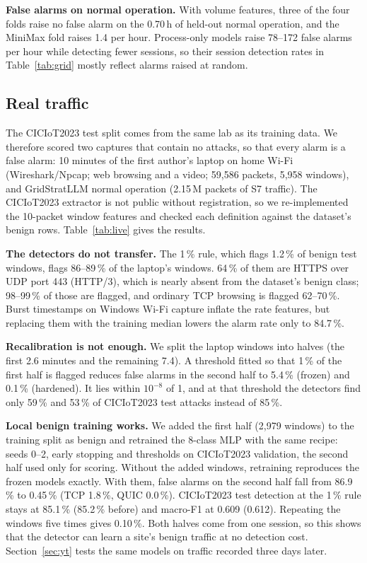 \documentclass[conference]{IEEEtran}
\begin{document}
\textbf{False alarms on normal operation.} With volume features, three of the four folds raise no false alarm on the 0.70\,h of held-out normal operation, and the MiniMax fold raises 1.4 per hour. Process-only models raise 78--172 false alarms per hour while detecting fewer sessions, so their session detection rates in Table~\ref{tab:grid} mostly reflect alarms raised at random.

\subsection{Real traffic}\label{sec:live}
The CICIoT2023 test split comes from the same lab as its training data. We therefore scored two captures that contain no attacks, so that every alarm is a false alarm: 10 minutes of the first author's laptop on home Wi-Fi (Wireshark/Npcap; web browsing and a video; 59,586 packets, 5,958 windows), and GridStratLLM normal operation (2.15\,M packets of S7 traffic). The CICIoT2023 extractor is not public without registration, so we re-implemented the 10-packet window features and checked each definition against the dataset's benign rows. Table~\ref{tab:live} gives the results.

\textbf{The detectors do not transfer.} The 1\,\% rule, which flags 1.2\,\% of benign test windows, flags 86--89\,\% of the laptop's windows. 64\,\% of them are HTTPS over UDP port 443 (HTTP/3), which is nearly absent from the dataset's benign class; 98--99\,\% of those are flagged, and ordinary TCP browsing is flagged 62--70\,\%. Burst timestamps on Windows Wi-Fi capture inflate the rate features, but replacing them with the training median lowers the alarm rate only to 84.7\,\%.

\textbf{Recalibration is not enough.} We split the laptop windows into halves (the first 2.6 minutes and the remaining 7.4). A threshold fitted so that 1\,\% of the first half is flagged reduces false alarms in the second half to 5.4\,\% (frozen) and 0.1\,\% (hardened). It lies within $10^{-8}$ of 1, and at that threshold the detectors find only 59\,\% and 53\,\% of CICIoT2023 test attacks instead of 85\,\%.

\textbf{Local benign training works.} We added the first half (2,979 windows) to the training split as benign and retrained the 8-class MLP with the same recipe: seeds 0--2, early stopping and thresholds on CICIoT2023 validation, the second half used only for scoring. Without the added windows, retraining reproduces the frozen models exactly. With them, false alarms on the second half fall from 86.9\,\% to 0.45\,\% (TCP 1.8\,\%, QUIC 0.0\,\%). CICIoT2023 test detection at the 1\,\% rule stays at 85.1\,\% (85.2\,\% before) and macro-F1 at 0.609 (0.612). Repeating the windows five times gives 0.10\,\%. Both halves come from one session, so this shows that the detector can learn a site's benign traffic at no detection cost. Section~\ref{sec:yt} tests the same models on traffic recorded three days later.
\end{document}
